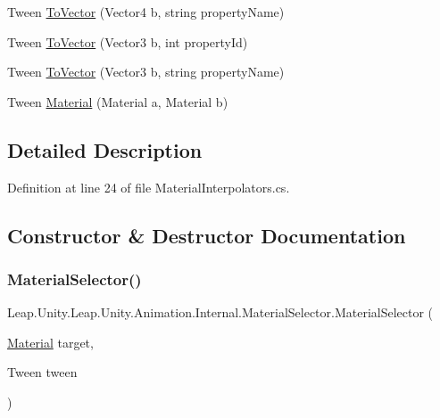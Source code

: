 \begin{DoxyCompactItemize}
\item 
Tween \mbox{\hyperlink{struct_leap_1_1_unity_1_1_leap_1_1_unity_1_1_animation_1_1_internal_1_1_material_selector_ae112a25e47a84c9b0afab7c79eed61e1}{To\+Vector}} (Vector4 b, string property\+Name)
\item 
Tween \mbox{\hyperlink{struct_leap_1_1_unity_1_1_leap_1_1_unity_1_1_animation_1_1_internal_1_1_material_selector_adea03a2a99f2b4f6f2f60690ea09ecf2}{To\+Vector}} (Vector3 b, int property\+Id)
\item 
Tween \mbox{\hyperlink{struct_leap_1_1_unity_1_1_leap_1_1_unity_1_1_animation_1_1_internal_1_1_material_selector_a308061c2c3ef352a3ed819d4e9f5de62}{To\+Vector}} (Vector3 b, string property\+Name)
\item 
Tween \mbox{\hyperlink{struct_leap_1_1_unity_1_1_leap_1_1_unity_1_1_animation_1_1_internal_1_1_material_selector_acca452a6ebdd665db3e45f590437813b}{Material}} (Material a, Material b)
\end{DoxyCompactItemize}


\subsection{Detailed Description}


Definition at line 24 of file Material\+Interpolators.\+cs.



\subsection{Constructor \& Destructor Documentation}
\mbox{\label{struct_leap_1_1_unity_1_1_leap_1_1_unity_1_1_animation_1_1_internal_1_1_material_selector_a6ab9c747dd93cf00ef40f4ee3ab09af7}} 
\subsubsection{\texorpdfstring{MaterialSelector()}{MaterialSelector()}}
{\footnotesize\ttfamily Leap.\+Unity.\+Leap.\+Unity.\+Animation.\+Internal.\+Material\+Selector.\+Material\+Selector (\begin{DoxyParamCaption}\item[{\mbox{\hyperlink{struct_leap_1_1_unity_1_1_leap_1_1_unity_1_1_animation_1_1_internal_1_1_material_selector_acca452a6ebdd665db3e45f590437813b}{Material}}}]{target,  }\item[{Tween}]{tween }\end{DoxyParamCaption})}



